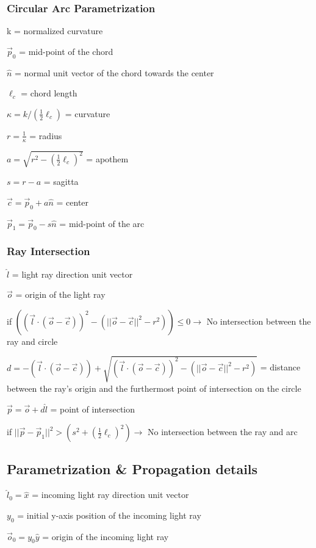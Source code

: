 \documentclass{article}
\begin{document}
\subsubsection{Circular Arc Parametrization}
k = normalized curvature

$\vec{p}_0$ = mid-point of the chord

$\hat{n}$ = normal unit vector of the chord towards the center

$\ell_c$ = chord length

$\kappa = k / (\frac{1}{2} \ell_c)$ = curvature

$r = \frac{1}{\kappa}$ = radius

$a = \sqrt{r^2 - (\frac{1}{2}\ell_c)^2}$ = apothem

$s = r - a$ = sagitta

$\vec{c} = \vec{p}_0 + a \hat{n}$ = center

$\vec{p}_1 = \vec{p}_0 - s \hat{n}$ = mid-point of the arc

\subsubsection{Ray Intersection}
$\hat{l}$ = light ray direction unit vector

$\vec{o}$ = origin of the light ray

if $((\vec{l} \cdot (\vec{o} - \vec{c}))^2 - (||\vec{o} - \vec{c}||^2 - r^2)) \leq 0 \to $ No intersection between the ray and circle

$d = -(\vec{l} \cdot (\vec{o} - \vec{c})) + \sqrt{(\vec{l} \cdot (\vec{o} - \vec{c}))^2 - (||\vec{o} - \vec{c}||^2 - r^2)}$
= distance between the ray's origin and the furthermost point of intersection on the circle

$\vec{p} = \vec{o} + d\hat{l}$ = point of intersection

if $||\vec{p} - \vec{p}_1||^2 > (s^2 + (\frac{1}{2}\ell_c)^2) \to $ No intersection between the ray and arc

\subsection{Parametrization \& Propagation details}\label{subsec:parametrization&propagation-details}
$\hat{l}_0 = \hat{x}$ = incoming light ray direction unit vector

$y_0$ = initial y-axis position of the incoming light ray

$\vec{o}_0 = y_0\hat{y}$ = origin of the incoming light ray
\end{document}
